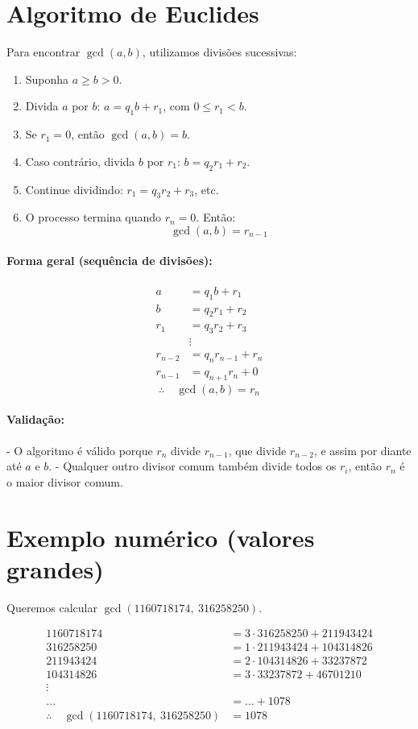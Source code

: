 \documentclass[12pt]{book}
\begin{document}
\section*{Algoritmo de Euclides}
Para encontrar $\gcd(a, b)$, utilizamos divisões sucessivas:

\begin{enumerate}
  \item Suponha $a \geq b > 0$.
  \item Divida $a$ por $b$: \quad $a = q_1b + r_1$, \quad com $0 \leq r_1 < b$.
  \item Se $r_1 = 0$, então $\gcd(a, b) = b$.
  \item Caso contrário, divida $b$ por $r_1$: \quad $b = q_2r_1 + r_2$.
  \item Continue dividindo: $r_1 = q_3r_2 + r_3$, etc.
  \item O processo termina quando $r_n = 0$. Então:
  \[
  \gcd(a, b) = r_{n-1}
  \]
\end{enumerate}

\paragraph{Forma geral (sequência de divisões):}
\begin{align*}
  a &= q_1b + r_1 \\
  b &= q_2r_1 + r_2 \\
  r_1 &= q_3r_2 + r_3 \\
      &\vdots \\
  r_{n-2} &= q_nr_{n-1} + r_n \\
  r_{n-1} &= q_{n+1}r_n + 0
\end{align*}
\[
\therefore\quad \gcd(a, b) = r_n
\]

\paragraph{Validação:}
- O algoritmo é válido porque $r_n$ divide $r_{n-1}$, que divide $r_{n-2}$, e assim por diante até $a$ e $b$.
- Qualquer outro divisor comum também divide todos os $r_i$, então $r_n$ é o maior divisor comum.

\section*{Exemplo numérico (valores grandes)}
Queremos calcular $\gcd(1160718174,\ 316258250)$.

\begin{align*}
1160718174 &= 3 \cdot 316258250 + 211943424 \\
316258250  &= 1 \cdot 211943424 + 104314826 \\
211943424  &= 2 \cdot 104314826 + 33237872 \\
104314826  &= 3 \cdot 33237872 + 46701210 \\
\vdots & \\
...     &= ... + 1078 \\
\therefore\quad \gcd(1160718174,\ 316258250) &= 1078
\end{align*}
\end{document}
